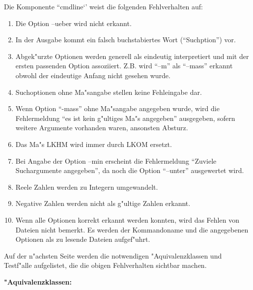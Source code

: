 

Die Komponente ``cmdline`' weist die folgenden Fehlverhalten auf:

\begin{enumerate}

\item Die Option --ueber wird nicht erkannt.

\item In der Ausgabe kommt ein falsch buchstabiertes Wort
(``Suchption'') vor. 

\item Abgek"urzte Optionen werden generell als eindeutig interpretiert
und mit der ersten passenden Option assoziiert. 
Z.B. wird ``--m'' als ``--mass'' erkannt
obwohl der eindeutige Anfang nicht gesehen wurde.

\item Suchoptionen ohne Ma"sangabe stellen keine Fehleingabe dar.

\item Wenn Option ``-mass'' ohne Ma"sangabe angegeben wurde,
wird die Fehlermeldung ``es ist kein g"ultiges Ma"s angegeben''
ausgegeben, sofern weitere Argumente vorhanden waren, ansonsten
Absturz. 

\item Das Ma"s LKHM wird immer durch LKOM ersetzt.

\item Bei Angabe der Option --min erscheint die 
Fehlermeldung ``Zuviele Suchargumente angegeben'', da noch die
Option ``--unter'' ausgewertet wird.

\item Reele Zahlen werden zu Integern umgewandelt.

\item Negative Zahlen werden nicht als g"ultige Zahlen erkannt.

\item Wenn alle Optionen korrekt erkannt werden
konnten, wird das Fehlen von Dateien nicht bemerkt. Es werden der 
Kommandoname und die angegebenen Optionen als zu lesende Dateien
aufgef"uhrt. 

\end{enumerate}

Auf der n"achsten Seite werden die notwendigen "Aquivalenzklassen und
Testf"alle aufgelistet, die die obigen Fehlverhalten sichtbar machen.

\newpage

\textbf{"Aquivalenzklassen:}
\smallskip

